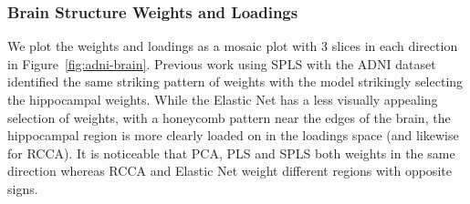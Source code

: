 \subsubsection{Brain Structure Weights and Loadings}

We plot the weights and loadings as a mosaic plot with 3 slices in each direction in Figure~\ref{fig:adni-brain}.
Previous work using SPLS with the ADNI dataset identified the same striking pattern of weights with the model strikingly selecting the hippocampal weights\cite{monteiro2016multiple}.
While the Elastic Net has a less visually appealing selection of weights, with a honeycomb pattern near the edges of the brain, the hippocampal region is more clearly loaded on in the loadings space (and likewise for RCCA).
It is noticeable that PCA, PLS and SPLS both weights in the same direction whereas RCCA and Elastic Net weight different regions with opposite signs.

